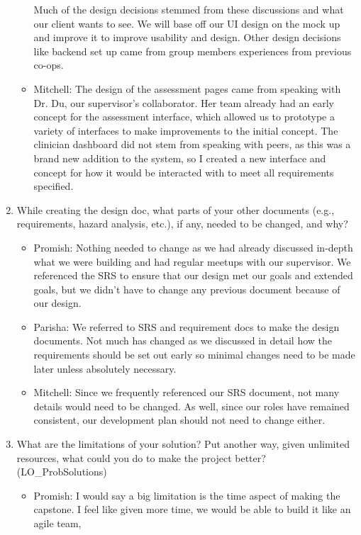 \documentclass[12pt, titlepage]{article}
\begin{document}
\begin{enumerate}
\begin{itemize}
     Much of the design decisions stemmed from these discussions and what our client wants to see. We will base off our UI design on the
     mock up and improve it to improve usability and design. Other design decisions like backend set up came from group members experiences
     from previous co-ops.
     \item Mitchell: The design of the assessment pages came from speaking with Dr. Du, our supervisor's collaborator. Her team already had an early
     concept for the assessment interface, which allowed us to prototype a variety of interfaces to make improvements to the initial concept. The clinician dashboard
     did not stem from speaking with peers, as this was a brand new addition to the system, so I created a new interface and concept for how it would be interacted with
     to meet all requirements specified.
  \end{itemize}
  \item While creating the design doc, what parts of your other documents (e.g.,
  requirements, hazard analysis, etc.), if any, needed to be changed, and why?
  \begin{itemize}
    \item Promish: Nothing needed to change as we had already discussed in-depth what we were building and had regular meetups with our supervisor.
    We referenced the SRS to ensure that our design met our goals and extended goals, but we didn't have to change any previous document because of our design.  
    \item Parisha: We referred to SRS and requirement docs to make the design documents. Not much has changed as we discussed in detail how the requirements should
    be set out early so minimal changes need to be made later unless absolutely necessary. 
    \item Mitchell: Since we frequently referenced our SRS document, not many details would need to be changed. As well, since our roles have remained consistent,
    our development plan should not need to change either.
  \end{itemize}
  \item What are the limitations of your solution? Put another way, given
  unlimited resources, what could you do to make the project better? (LO\_ProbSolutions)
  \begin{itemize}
    \item Promish: I would say a big limitation is the time aspect of making the capstone. I feel like given more time, we would be able to build it like an agile team,

\end{itemize}
\end{enumerate}
\end{document}
